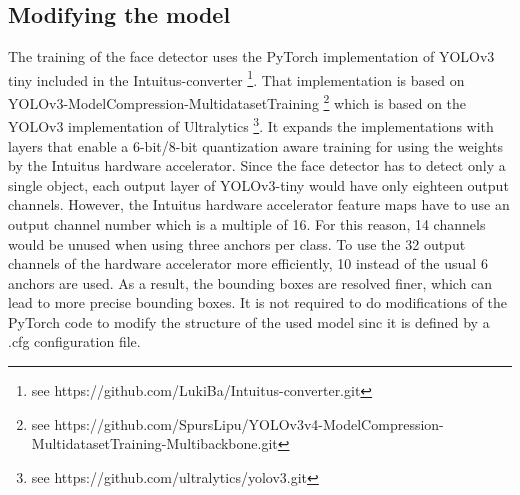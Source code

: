 \documentclass[%
a4paper,
twoside,
openany,
dvipsnames
]
{report}
\begin{document}
	\subsection{Modifying the model}
	The training of the face detector uses the PyTorch implementation of YOLOv3 tiny included in the Intuitus-converter \footnote{see https://github.com/LukiBa/Intuitus-converter.git}. That implementation is based on YOLOv3-ModelCompression-MultidatasetTraining \footnote{see https://github.com/SpursLipu/YOLOv3v4-ModelCompression-MultidatasetTraining-Multibackbone.git} which is based on the YOLOv3 implementation of Ultralytics \footnote{see https://github.com/ultralytics/yolov3.git}. It expands the implementations with layers that enable a 6-bit/8-bit quantization aware training for using the weights by the Intuitus hardware accelerator. 
	Since the face detector has to detect only a single object, each output layer of YOLOv3-tiny would have only eighteen output channels. However, the Intuitus hardware accelerator feature maps have to use an output channel number which is a multiple of 16. For this reason, 14 channels would be unused when using three anchors per class. To use the 32 output channels of the hardware accelerator more efficiently, 10 instead of the usual 6 anchors are used. As a result, the bounding boxes are resolved finer, which can lead to more precise bounding boxes. It is not required to do modifications of the PyTorch code to modify the structure of the used model sinc it is defined by a .cfg configuration file. \\	
	
\end{document}
